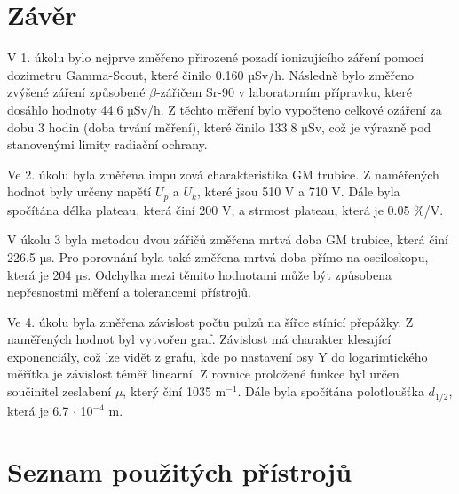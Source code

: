 \documentclass{protokol}
\begin{document}
\section{Závěr}

        V 1. úkolu bylo nejprve změřeno přirozené pozadí ionizujícího záření pomocí dozimetru Gamma-Scout, které činilo 0.160 µSv/h. Následně bylo změřeno zvýšené záření způsobené $\beta$-zářičem Sr-90 v laboratorním přípravku, které dosáhlo hodnoty 44.6 µSv/h. Z těchto měření bylo vypočteno celkové ozáření za dobu 3 hodin (doba trvání měření), které činilo 133.8 µSv, což je výrazně pod stanovenými limity radiační ochrany.
        
        Ve 2. úkolu byla změřena impulzová charakteristika GM trubice. Z naměřených hodnot byly určeny napětí $U_p$ a $U_k$, které jsou 510 V a 710 V. Dále byla spočítána délka plateau, která činí 200 V, a strmost plateau, která je 0.05 \%/V.

        V úkolu 3 byla metodou dvou zářičů změřena mrtvá doba GM trubice, která činí 226.5 µs. Pro porovnání byla také změřena mrtvá doba přímo na osciloskopu, která je 204 µs. Odchylka mezi těmito hodnotami může být způsobena nepřesnostmi měření a tolerancemi přístrojů.

        Ve 4. úkolu byla změřena závislost počtu pulzů na šířce stínící přepážky. Z naměřených hodnot byl vytvořen graf. Závislost má charakter klesající exponenciály, což lze vidět z grafu, kde po nastavení osy Y do logarimtického měřítka je závislost téměř linearní. Z rovnice proložené funkce byl určen součinitel zeslabení $\mu$, který činí 1035 m$^{-1}$. Dále byla spočítána polotloušťka $d_{1/2}$, která je 6.7 $\cdot$ 10$^{-4}$ m.

    \cite{navod}
    \cite{vyhlaska}

\pagebreak


\section{Seznam použitých přístrojů}

\pagebreak


\end{document}
